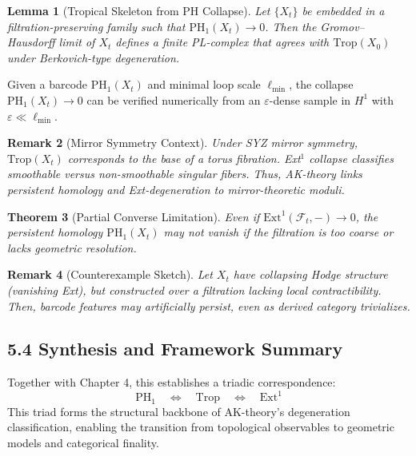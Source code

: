 \documentclass[11pt]{article}
\newtheorem{theorem}{Theorem}[section]
\newtheorem{remark}[theorem]{Remark}
\newtheorem{lemma}[theorem]{Lemma}
\begin{document}
\begin{lemma}[Tropical Skeleton from PH Collapse]
Let $\{X_t\}$ be embedded in a filtration-preserving family such that $\mathrm{PH}_1(X_t) \to 0$. Then the Gromov--Hausdorff limit of $X_t$ defines a finite PL-complex that agrees with $\mathrm{Trop}(X_0)$ under Berkovich-type degeneration.
\end{lemma}

\begin{proposition}
Given a barcode $\mathrm{PH}_1(X_t)$ and minimal loop scale $\ell_{\min}$, the collapse $\mathrm{PH}_1(X_t) \to 0$ can be verified numerically from an $\varepsilon$-dense sample in $H^1$ with $\varepsilon \ll \ell_{\min}$.
\end{proposition}

\begin{remark}[Mirror Symmetry Context]
Under SYZ mirror symmetry, $\mathrm{Trop}(X_t)$ corresponds to the base of a torus fibration. Ext$^1$ collapse classifies smoothable versus non-smoothable singular fibers. Thus, AK-theory links persistent homology and Ext-degeneration to mirror-theoretic moduli.
\end{remark}

\begin{theorem}[Partial Converse Limitation]
Even if $\mathrm{Ext}^1(\mathcal{F}_t, -) \to 0$, the persistent homology $\mathrm{PH}_1(X_t)$ may not vanish if the filtration is too coarse or lacks geometric resolution.
\end{theorem}

\begin{remark}[Counterexample Sketch]
Let $X_t$ have collapsing Hodge structure (vanishing Ext), but constructed over a filtration lacking local contractibility. Then, barcode features may artificially persist, even as derived category trivializes.
\end{remark}

\subsection{5.4 Synthesis and Framework Summary}

Together with Chapter 4, this establishes a triadic correspondence:
\[
\mathrm{PH}_1 \quad \Longleftrightarrow \quad \mathrm{Trop} \quad \Longleftrightarrow \quad \mathrm{Ext}^1
\]
This triad forms the structural backbone of AK-theory’s degeneration classification, enabling the transition from topological observables to geometric models and categorical finality.
\end{document}
